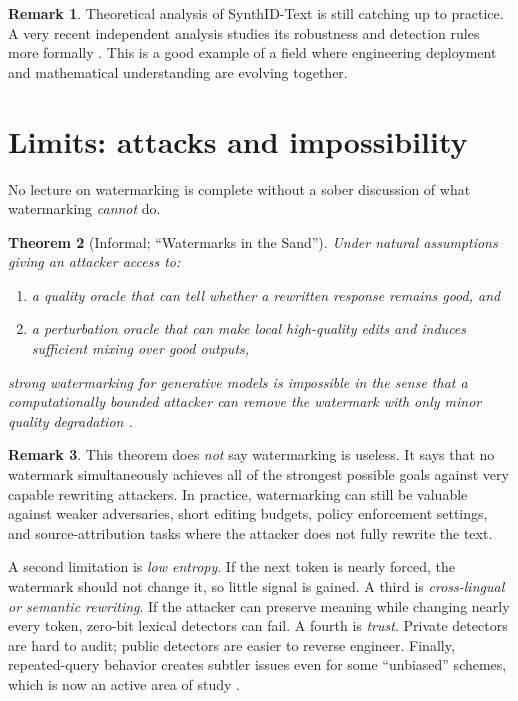 \documentclass[11pt]{article}
\newtheorem{theorem}{Theorem}[section]
\theoremstyle{definition}
\newtheorem{remark}[theorem]{Remark}
\newcommand{\1}{\mathbf{1}}
\begin{document}
\begin{remark}
Theoretical analysis of SynthID-Text is still catching up to practice. A very recent independent analysis studies its robustness and detection rules more formally \cite{omidi2026synthid}. This is a good example of a field where engineering deployment and mathematical understanding are evolving together.
\end{remark}

\section{Limits: attacks and impossibility}

No lecture on watermarking is complete without a sober discussion of what watermarking \emph{cannot} do.

\begin{theorem}[Informal; ``Watermarks in the Sand'']
Under natural assumptions giving an attacker access to:
\begin{enumerate}
    \item a quality oracle that can tell whether a rewritten response remains good, and
    \item a perturbation oracle that can make local high-quality edits and induces sufficient mixing over good outputs,
\end{enumerate}
strong watermarking for generative models is impossible in the sense that a computationally bounded attacker can remove the watermark with only minor quality degradation \cite{zhang2024watermarkssand}.
\end{theorem}

\begin{remark}
This theorem does \emph{not} say watermarking is useless. It says that no watermark simultaneously achieves all of the strongest possible goals against very capable rewriting attackers. In practice, watermarking can still be valuable against weaker adversaries, short editing budgets, policy enforcement settings, and source-attribution tasks where the attacker does not fully rewrite the text.
\end{remark}

A second limitation is \emph{low entropy}. If the next token is nearly forced, the watermark should not change it, so little signal is gained. A third is \emph{cross-lingual or semantic rewriting}. If the attacker can preserve meaning while changing nearly every token, zero-bit lexical detectors can fail. A fourth is \emph{trust}. Private detectors are hard to audit; public detectors are easier to reverse engineer. Finally, repeated-query behavior creates subtler issues even for some ``unbiased'' schemes, which is now an active area of study \cite{wu2025unbiased}.
\end{document}

